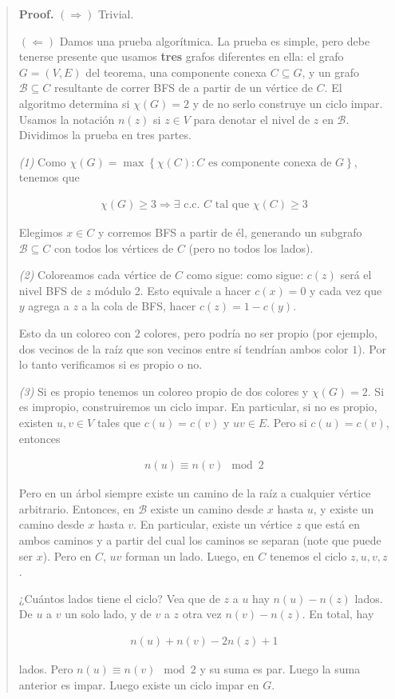 \documentclass[a4paper]{article}
\begin{document}
\small
\begin{quote}

\textbf{Proof.} $(\Rightarrow)$ Trivial. 

$(\Leftarrow)$ Damos una prueba algorítmica. La prueba es simple, pero debe
tenerse presente que usamos \textbf{tres} grafos diferentes en ella: el grafo
$G = (V, E) $ del teorema, una componente conexa $C \subseteq G$, y un grafo
$\mathcal{B} \subseteq C$ resultante de correr BFS de a partir de un vértice de
$C$. El algoritmo determina si $\chi(G) = 2$ y de no serlo construye un ciclo
impar. Usamos la notación $n(z)$ si $z \in V$ para denotar el nivel de $z$ en
$\mathcal{B}$. Dividimos la prueba en tres partes.

\textit{(1)} Como $\chi(G) = \max \left\{ \chi(C) : C \text{ es componente
conexa de  } G \right\} $, tenemos que 

\begin{align*}
    \chi(G) \geq 3 \Rightarrow\exists \text{ c.c. $C$ tal que } \chi(C) \geq 3
\end{align*}

Elegimos $x \in C$ y corremos BFS a partir de él, generando un subgrafo
$\mathcal{B} \subseteq C$ con todos los vértices de $C$ (pero no todos los
lados).

\textit{(2)} Coloreamos cada vértice de $C$ como sigue: como sigue: $c(z)$ será el nivel
BFS de $z$ módulo 2. Esto equivale a hacer $c(x) = 0$ y cada vez que $y$ agrega
a $z$ a la cola de BFS, hacer $c(z) =  1 - c(y)$.

Esto da un coloreo con $2$ colores, pero podría no ser propio (por ejemplo, dos
vecinos de la raíz que son vecinos entre sí tendrían ambos color $1$). Por lo
tanto verificamos si es propio o no. 

\textit{(3)} Si es propio tenemos un coloreo propio de dos colores y $\chi(G) =
2$. Si es impropio, construiremos un ciclo impar. En particular, si no es
propio, existen $u, v \in V$ tales que $c(u) = c(v) $ y $uv \in E$. Pero si
$c(u) = c(v)$, entonces

\begin{align*}
    n(u) \equiv n(v) \mod 2
\end{align*}

Pero en un árbol siempre existe un camino
de la raíz a cualquier vértice arbitrario. Entonces, en $\mathcal{B}$ existe un
camino desde $x$ hasta $u$, y existe un camino desde $x$ hasta $v$. En
particular, existe un vértice $z$ que está en ambos caminos y a partir del cual
los caminos se separan (note que puede ser $x$). Pero en $C$, $uv$ forman un
lado. Luego, en $C$ tenemos el ciclo $z, u, v, z$. 

¿Cuántos lados tiene el ciclo? Vea que de $z$ a $u$ hay $n(u) - n(z)$
lados. De $u$ a $v$ un solo lado, y de $v$ a $z$ otra vez $n(v) - n(z)$.
En total, hay 

\begin{align*}
     n(u) + n(v) - 2 n(z) + 1
\end{align*}

lados. Pero $n(u) \equiv n(v) \mod 2$ y su suma
es par. Luego la suma anterior es impar. Luego existe un ciclo impar en $G$.

\end{quote}
\normalsize
\end{document}
